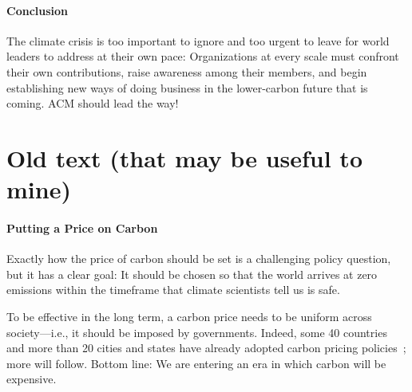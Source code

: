 \documentclass[12pt]{article}
\newcommand{\bcp}[1]{\ifdraft{\bf [bcp: #1]}\fi}
\newcommand{\SECTION}{\paragraph*}
\begin{document}




\SECTION{Conclusion}


The climate crisis is too important to ignore and too urgent to leave for
world leaders to address at their own pace: Organizations at every scale
must confront their own contributions, raise awareness among their members,
and begin establishing new ways of doing business in the lower-carbon future
that is coming.  ACM should lead the way!



\newpage

\section*{Old text (that may be useful to mine)}

\SECTION{Putting a Price on Carbon}

Exactly how the price of carbon
should be set is a challenging policy question, but it has a clear goal: It
should be chosen so that the world arrives at zero emissions within the
timeframe that climate scientists tell us is safe.

To be effective in the long term, a carbon price needs to be uniform across
society---i.e., it should be imposed by governments.  Indeed, some 40
countries and more than 20 cities and states have already adopted
carbon pricing policies~\cite{pricingcarbon}; more will follow.
%
Bottom line: We are entering an era in which carbon will be expensive.
\end{document}
